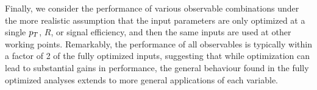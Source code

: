 Finally, we consider the performance of various observable combinations under the more realistic assumption that the input parameters are only optimized at a single $p_T$, $R$, or signal efficiency, and then the same inputs are used at other working points. Remarkably, the performance of all observables is typically within a factor of 2 of the fully optimized inputs, suggesting that while optimization can lead to substantial gains in performance, the general behaviour found in the fully optimized analyses extends to more general applications of each variable.






